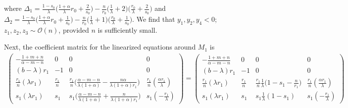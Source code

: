 \documentclass[a4paper,11pt]{article}
\def\BO{{\mathcal{O}}}
\theoremstyle{remark}
\begin{document}
where $\Delta_1 = \frac{1-s_0}{\lambda}\big(\frac{1+\alpha}{\lambda}r_0 + \frac{2}{s_0}\big) -\frac{n}{r_0} \big( \frac{1}{\lambda} + 2\big)\big(\frac{r_0}{\lambda} + \frac{2}{s_0}\big)$
and $\Delta_2 = \frac{1-s_0}{\lambda}\big(\frac{1+\alpha}{\lambda}r_0 + \frac{1}{s_0}\big) -\frac{n}{r_0} \big( \frac{1}{\lambda} + 1\big)\big(\frac{r_0}{\lambda} + \frac{1}{s_0}\big)$.
We find that $y_1,y_2,y_4<0$; $z_1,z_2,z_3 \sim\BO(n)$, provided $n$ is sufficiently small.

Next, the coefficient matrix for the linearized equations around $M_1$ is
\begin{align*}
 \begin{pmatrix}
          -\frac{1+m+n}{\alpha-m-n} & 0 & 0 & 0\\
          (b-\lambda)r_1 & -1 & 0 & 0\\
          \frac{r_1}{n}(\lambda r_1) & \frac{r_1}{n} & \frac{r_1}{n}\Big(\frac{\alpha-m-n}{\lambda(1+\alpha)} - \frac{n\alpha}{\lambda(1+\alpha)r_1}\Big) & \frac{r_1}{n}(\frac{\alpha r_1}{\lambda})\\
          s_1(\lambda r_1) & s_1 & s_1\Big(\frac{\alpha-m-n}{\lambda(1+\alpha)} + \frac{n}{\lambda(1+\alpha)r_1}\Big) & s_1(-\frac{r_1}{\lambda})
         \end{pmatrix}
         =\begin{pmatrix}
          -\frac{1+m+n}{\alpha-m-n} & 0 & 0 & 0\\
          (b-\lambda)r_1 & -1 & 0 & 0\\
          \frac{r_1}{n}(\lambda r_1) & \frac{r_1}{n} & \frac{r_1}{n}\frac{1}{\lambda}\Big(1-s_1-\frac{n}{r_1}\Big) & \frac{r_1}{n}(\frac{\alpha r_1}{\lambda})\\
          s_1(\lambda r_1) & s_1 & s_1\frac{1}{\lambda}(1-s_1) & s_1(-\frac{r_1}{\lambda})
         \end{pmatrix}
\end{align*}
\end{document}
